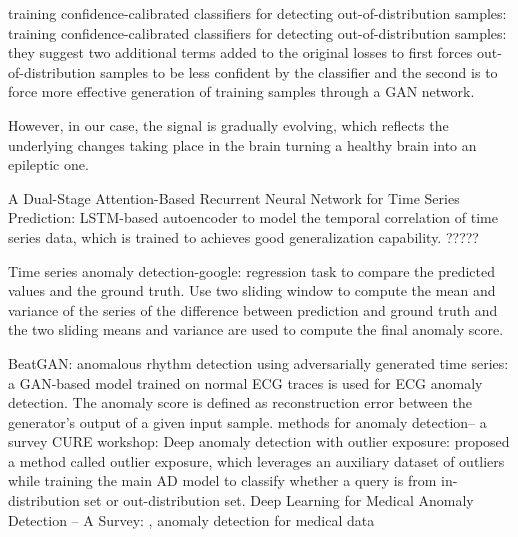 \documentclass{article}
\begin{document}
	
	
	
	
	
	
	
	
	
	 
	\cite{lee2017training} training confidence-calibrated classifiers for detecting out-of-distribution samples: training confidence-calibrated classifiers for detecting out-of-distribution samples: they suggest two additional terms added to the original losses to first forces out-of-distribution samples to be less confident by the classifier and the second is to force more effective generation of training samples through a GAN network.
	
	
	
	
	\cite{ELGER2018279} 
	However, in our case, the signal is gradually evolving, which reflects the underlying changes taking place in the brain turning a healthy brain into an epileptic one. 
	
	
	
	\cite{qin2017dual} A Dual-Stage Attention-Based Recurrent Neural Network for Time Series Prediction: LSTM-based autoencoder to model the temporal correlation of time series data, which is trained to achieves good generalization capability. ?????

	
	
 
	
	
	\cite{shipmon2017time} Time series anomaly detection-google: regression task to compare the predicted values and the ground truth. Use two sliding window to compute the mean and variance of the series of the difference between prediction and ground truth and the two sliding means and variance are used to compute the final anomaly score. 
	
	
	
	
	\cite{zhou2019beatgan} BeatGAN: anomalous rhythm detection using adversarially generated time series: a GAN-based model trained on normal ECG traces is used for ECG anomaly detection. The anomaly score is defined as reconstruction error between the generator's output of a given input sample.
	\cite{kalinichenko2014methods} methods for anomaly detection-- a survey CURE workshop:	
	\cite{hendrycks2018deep} Deep anomaly detection with outlier exposure: proposed a method called outlier exposure, which leverages an auxiliary dataset of outliers while training the main AD model to classify whether a query is from in-distribution set or out-distribution set.
	\cite{2020Deep} Deep Learning for Medical Anomaly Detection -- A Survey: , 
	\cite{Salem2013SensorFA} anomaly detection for medical data 
	
\end{document}
